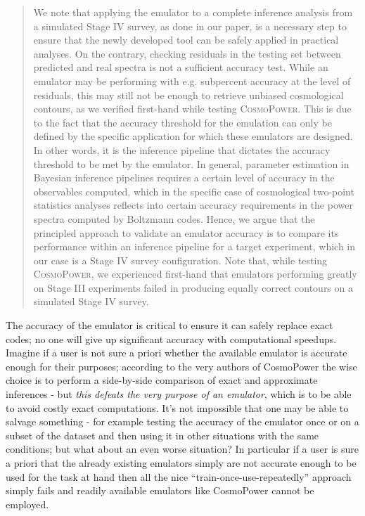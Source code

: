 \begin{quote}
    We note that applying the emulator to a complete inference analysis from a simulated Stage IV survey, as done in our paper, is a necessary step to ensure that the newly developed tool can be safely applied in practical analyses. On  the contrary, checking residuals in the testing set between predicted and real spectra is not a sufficient accuracy test. While an emulator may be performing with e.g. subpercent accuracy at the level of residuals, this may still not be enough to retrieve unbiased cosmological contours, as we verified first-hand while testing \textsc{CosmoPower}. This is due to the fact that the accuracy threshold for the emulation can only be defined by the specific application for which these emulators are designed. In other words, it is the inference pipeline that dictates the accuracy threshold to be met by the emulator. In general, parameter estimation in Bayesian inference pipelines requires a certain level of accuracy in the observables computed, which in the specific case of cosmological two-point statistics analyses reflects into certain accuracy requirements in the power spectra computed by Boltzmann codes. Hence, we argue that the principled approach to validate an emulator accuracy is to compare its performance within an inference pipeline for a target experiment, which in our case is a Stage IV survey configuration. Note that, while testing \textsc{CosmoPower}, we experienced first-hand that emulators performing greatly on Stage III experiments failed in producing equally correct contours on a simulated Stage IV survey.
\end{quote}
The accuracy of the emulator is critical to ensure it can safely replace exact codes; no one will give up significant accuracy with computational speedups. Imagine if a user is not sure a priori whether the available emulator is accurate enough for their purposes; according to the very authors of CosmoPower the wise choice is to perform a side-by-side comparison of exact and approximate inferences - but \emph{this defeats the very purpose of an emulator}, which is to be able to avoid costly exact computations. It's not impossible that one may be able to salvage something - for example testing the accuracy of the emulator once or on a subset of the dataset and then using it in other situations with the same conditions; but what about an even worse situation? In particular if a user is sure a priori that the already existing emulators simply are not accurate enough to be used for the task at hand then all the nice ``train-once-use-repeatedly'' approach simply fails and readily available emulators like CosmoPower cannot be employed.

